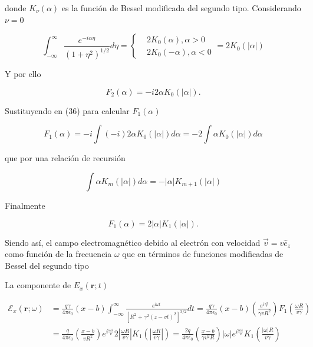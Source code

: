 \documentclass[a4paper,10pt]{article}
\begin{document}
donde $K_{\nu}(\alpha)$ es la función de Bessel modificada del segundo tipo. Considerando $\nu=0$ 

\begin{equation}
\int_{-\infty}^{\infty} \frac{e^{-i\alpha\eta}}{(1+\eta^2)^{1/2}} d\eta =
\left\{
\begin{aligned}
	&2K_{0}(\alpha), \alpha>0	\\
	&2K_{0}(-\alpha), \alpha<0
\end{aligned}
\right.
=2K_{0}(|\alpha|)
\end{equation}

Y por ello

\begin{equation}
F_2(\alpha)=-i2\alpha K_0 (|\alpha|).
\end{equation}

Sustituyendo en (36) para calcular $F_1(\alpha)$

\begin{equation}
F_1(\alpha)=-i \int (-i)2\alpha K_0 (|\alpha|) d\alpha = -2 \int \alpha K_0 (|\alpha|) d\alpha
\end{equation}

que por una relación de recursión

\begin{equation}
\int \alpha K_m (|\alpha|) d\alpha = -|\alpha| K_{m+1} (|\alpha|)
\end{equation}

Finalmente

\begin{equation}
F_1(\alpha)=2|\alpha|K_1 (|\alpha|).
\end{equation}

Siendo así, el campo electromagnético debido al electrón con velocidad $\vec{v}=v\hat{e}_z$ como función de la frecuencia $\omega$ que en términos de funciones modificadas de Bessel del segundo tipo

La componente de $E_x(\textbf{r};t)$

\begin{equation}
\begin{aligned}
\mathcal{E}_x(\textbf{r};\omega)	&=\frac{q\gamma}{4\pi\epsilon_0} (x-b)\int_{-\infty}^{\infty} \frac{e^{i\omega t}}{[R^2+\gamma^2(z-vt)^2]^{3/2}} dt	
	=\frac{q\gamma}{4\pi\epsilon_0} (x-b) \left(\frac{e^{i\frac{\omega z}{v}} }{\gamma vR^2} \right) F_1\left( \frac{\omega R}{v\gamma}\right)	\\
	&=\frac{q}{4\pi\epsilon_0} \left(\frac{x-b}{v R^2} \right) e^{i\frac{\omega z}{v}} 2 \left| \frac{\omega R}{v \gamma} \right| K_1 \left( \left| \frac{\omega R}{v \gamma} \right| \right)
	=\frac{2q}{4\pi\epsilon_0} \left(\frac{x-b}{\gamma v^2 R} \right) |\omega| e^{i\frac{\omega z}{v}} K_1 \left(\frac{|\omega| R}{v \gamma} \right)
\end{aligned}
\end{equation}
\end{document}
